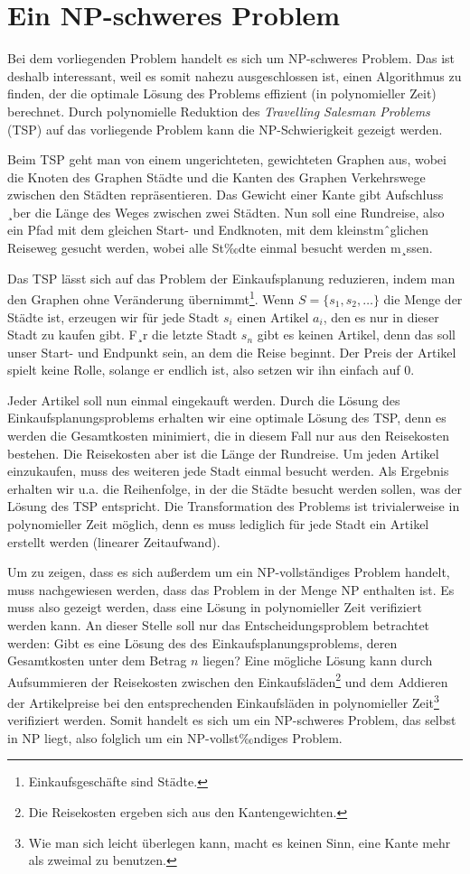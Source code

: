﻿\section{Ein NP-schweres Problem}
Bei dem vorliegenden Problem handelt es sich um NP-schweres Problem. Das ist deshalb interessant, weil es somit nahezu ausgeschlossen ist, einen Algorithmus zu finden, der die optimale Lösung des Problems effizient (in polynomieller Zeit) berechnet. Durch polynomielle Reduktion des \emph{Travelling Salesman Problems} (TSP) auf das vorliegende Problem kann die NP-Schwierigkeit gezeigt werden.

Beim TSP geht man von einem ungerichteten, gewichteten Graphen aus, wobei die Knoten des Graphen Städte und die Kanten des Graphen Verkehrswege zwischen den Städten repräsentieren. Das Gewicht einer Kante gibt Aufschluss ¸ber die Länge des Weges zwischen zwei Städten. Nun soll eine Rundreise, also ein Pfad mit dem gleichen Start- und Endknoten, mit dem kleinstmˆglichen Reiseweg gesucht werden, wobei alle St‰dte einmal besucht werden m¸ssen.

Das TSP lässt sich auf das Problem der Einkaufsplanung reduzieren, indem man den Graphen ohne Veränderung übernimmt\footnote{Einkaufsgeschäfte sind Städte.}. Wenn $S=\{s_1, s_2, \ldots\}$ die Menge der Städte ist, erzeugen wir für jede Stadt $s_i$ einen Artikel $a_i$, den es nur in dieser Stadt zu kaufen gibt. F¸r die letzte Stadt $s_n$ gibt es keinen Artikel, denn das soll unser Start- und Endpunkt sein, an dem die Reise beginnt. Der Preis der Artikel spielt keine Rolle, solange er endlich ist, also setzen wir ihn einfach auf $0$.

Jeder Artikel soll nun einmal eingekauft werden. Durch die Lösung des Einkaufsplanungsproblems erhalten wir eine optimale Lösung des TSP, denn es werden die Gesamtkosten minimiert, die in diesem Fall nur aus den Reisekosten bestehen. Die Reisekosten aber ist die Länge der Rundreise. Um jeden Artikel einzukaufen, muss des weiteren jede Stadt einmal besucht werden. Als Ergebnis erhalten wir u.a. die Reihenfolge, in der die Städte besucht werden sollen, was der Lösung des TSP entspricht. Die Transformation des Problems ist trivialerweise in polynomieller Zeit möglich, denn es muss lediglich für jede Stadt ein Artikel erstellt werden (linearer Zeitaufwand).

Um zu zeigen, dass es sich außerdem um ein NP-vollständiges Problem handelt, muss nachgewiesen werden, dass das Problem in der Menge NP enthalten ist. Es muss also gezeigt werden, dass eine Lösung in polynomieller Zeit verifiziert werden kann. An dieser Stelle soll nur das Entscheidungsproblem betrachtet werden: Gibt es eine Lösung des des Einkaufsplanungsproblems, deren Gesamtkosten unter dem Betrag $n$ liegen? Eine mögliche Lösung kann durch Aufsummieren der Reisekosten zwischen den Einkaufsläden\footnote{Die Reisekosten ergeben sich aus den Kantengewichten.} und dem Addieren der Artikelpreise bei den entsprechenden Einkaufsläden in polynomieller Zeit\footnote{Wie man sich leicht überlegen kann, macht es keinen Sinn, eine Kante mehr als zweimal zu benutzen.} verifiziert werden. Somit handelt es sich um ein NP-schweres Problem, das selbst in NP liegt, also folglich um ein NP-vollst‰ndiges Problem.
